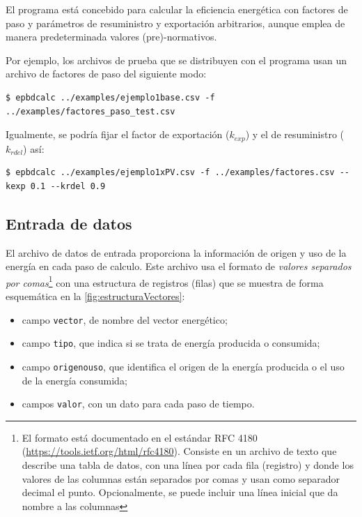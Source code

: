 \documentclass[10pt,notitlepage,oneside,a4paper]{article}
\begin{document}
El programa está concebido para calcular la eficiencia energética con factores de paso y parámetros de resuministro y exportación arbitrarios, aunque emplea de manera predeterminada valores (pre)-normativos.

Por ejemplo, los archivos de prueba que se distribuyen con el programa usan un archivo de factores de paso del siguiente modo:

\begin{Verbatim}[fontsize=\small]
	$ epbdcalc ../examples/ejemplo1base.csv -f ../examples/factores_paso_test.csv 
\end{Verbatim}

Igualmente, se podría fijar el factor de exportación ($k_{exp}$) y el de resuministro ($k_{rdel}$) así:

\begin{Verbatim}[fontsize=\small]
	$ epbdcalc ../examples/ejemplo1xPV.csv -f ../examples/factores.csv --kexp 0.1 --krdel 0.9
\end{Verbatim}

\subsection{Entrada de datos}

El archivo de datos de entrada proporciona la información de origen y uso de la energía en cada paso de calculo. Este archivo usa el formato de \textit{valores separados por comas}\footnote{El formato está documentado en el estándar RFC 4180 (\url{https://tools.ietf.org/html/rfc4180}). Consiste en un archivo de texto que describe una tabla de datos, con una línea por cada fila (registro) y donde los valores de las columnas están separados por comas y usan como separador decimal el punto. Opcionalmente, se puede incluir una línea inicial que da nombre a las columnas} con una estructura de registros (filas) que se muestra de forma esquemática en la \autoref{fig:estructuraVectores}:

\begin{itemize}
\item campo \texttt{vector}, de nombre del vector energético;
\item campo \texttt{tipo}, que indica si se trata de energía producida o consumida;
\item campo \texttt{origenouso}, que identifica el origen de la energía producida o el uso de la energía consumida;
\item campos \texttt{valor}, con un dato para cada paso de tiempo.
\end{itemize}
\end{document}
